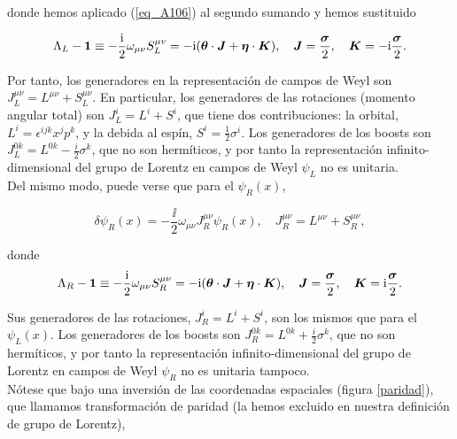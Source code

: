 donde hemos aplicado (\ref{eq_A106}) al segundo sumando y hemos sustituido

\begin{equation}
    \Lambda_L-\vb*{1} \equiv-\frac{\mathrm{i}}{2} \omega_{\mu \nu} S_L^{\mu v}=-\mathrm{i}(\vb*{\theta} \cdot \boldsymbol{J}+\vb*{\eta} \cdot \vb*{K}), \quad \vb*{J}=\frac{\vb*{\sigma}}{2}, \quad \vb*{K}=-\mathrm{i} \frac{\vb*{\sigma}}{2} .
\end{equation}

Por tanto, los generadores en la representación de campos de Weyl son $J_L^{\mu \nu}=L^{\mu \nu}+S_L^{\mu \nu}$. En particular, los generadores de las rotaciones (momento angular total) son $J_L^i=L^i+S^i$, que tiene dos contribuciones: la orbital, $L^i=\epsilon^{i j k} x^j p^k$, y la debida al espín, $S^i=\frac{1}{2} \sigma^i$. Los generadores de los boosts son $J_L^{0 k}=L^{0 k}-\frac{i}{2} \sigma^k$, que no son hermíticos, y por tanto la representación infinito-dimensional del grupo de Lorentz en campos de Weyl $\psi_L$ no es unitaria.\\

Del mismo modo, puede verse que para el $\psi_R(x)$,

\begin{equation}
    \delta \psi_R(x)=-\frac{\ii}{2} \omega_{\mu \nu} J_R^{\mu \nu} \psi_R(x), \quad J_R^{\mu \nu}=L^{\mu \nu}+S_R^{\mu \nu},
\end{equation}

donde
\begin{equation}
    \begin{split}
        \Lambda_R-\vb*{1} \equiv-\frac{\mathrm{i}}{2} \omega_{\mu \nu} S_R^{\mu \nu}=-\mathrm{i}(\vb*{\theta} \cdot \vb*{J}+\vb*{\eta} \cdot \vb*{K}), \quad \vb*{J}=\frac{\vb*{\sigma}}{2}, \quad \vb*{K}=\mathrm{i} \frac{\vb*{\sigma}}{2} .
    \end{split}
\end{equation}


Sus generadores de las rotaciones, $J_R^i=L^i+S^i$, son los mismos que para el $\psi_L(x)$. Los generadores de los boosts son $J_R^{0 k}=L^{0 k}+\frac{i}{2} \sigma^k$, que no son hermíticos, y por tanto la representación infinito-dimensional del grupo de Lorentz en campos de Weyl $\psi_R$ no es unitaria tampoco.\\

Nótese que bajo una inversión de las coordenadas espaciales (figura \ref{paridad}), que llamamos transformación de paridad (la hemos excluido en nuestra definición de grupo de Lorentz),

